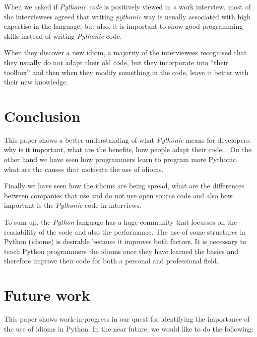 \documentclass[a4paper]{article}
\begin{document}
When we asked if \textit{Pythonic code} is positively viewed in a work interview, most of the interviewees agreed that writing \textit{pythonic} way is usually associated with high expertise in the language, but also, it is important to show good programming skills instead of writing \textit{Pythonic} code.

When they discover a new idiom, a majority of the interviewees recognised that they usually do not adapt their old code, but they incorporate into  ``their toolbox'' and then when they modify something in the code, leave it better with their new knowledge.


\section{Conclusion}

This paper shows a better understanding of what \textit{Pythonic} means for developers: why is it important, what are the benefits, how people adapt their code... On the other hand we have seen how programmers learn to program more Pythonic, what are the causes that motivate the use of idioms. 

Finally we have seen how the idioms are being spread, what are the differences between companies that use and do not use open source code and also how important is the \textit{Pythonic} code in interviews.

To sum up, the \textit{Python} language has a huge community that focusses on the readability of the code and also the performance. The use of some structures in Python (idioms) is desirable because it improves both factors. It is necessary to teach Python programmers the idioms once they have learned the basics and therefore improve their code for both a personal and professional field.

\section{Future work}

This paper shows work-in-progress in our quest for identifying the importance of the use of idioms in Python. In the near future, we would like to do the following:
\end{document}
